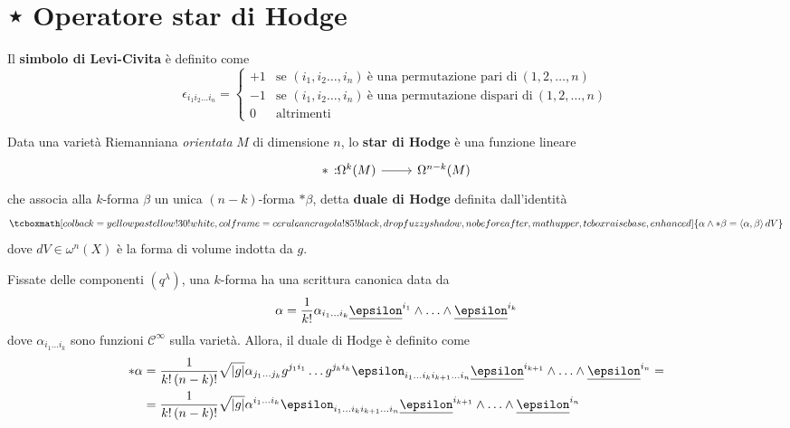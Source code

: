 \section{⋆ Operatore star di Hodge}
\begin{define}
	Il \textbf{simbolo di Levi-Civita} è definito come
	\begin{equation}
		\epsilon_{i_1i_2\ldots i_n}=\begin{cases}
			+1&\text{se }\left(i_1,i_2\ldots,i_n\right)\ \text{è una permutazione pari di}\ (1,2,\ldots, n)\\
			-1&\text{se }\left(i_1,i_2\ldots,i_n\right)\ \text{è una permutazione dispari di}\ (1,2,\ldots, n)\\
			0&\text{altrimenti}
		\end{cases}
	\end{equation}
\end{define}
\begin{define}%
	Data una varietà Riemanniana \textit{orientata} $M$ di dimensione $n$, lo \textbf{star di Hodge} è una funzione lineare
	\begin{equation*}
		\funz[\ast]{\Omega^k(M)}{\Omega^{n-k}(M)}
	\end{equation*}
	che associa alla $k$-forma $\beta$ un unica $(n-k)$-forma $\ast\beta$, detta \textbf{duale di Hodge} definita dall'identità
	\begin{equation}%
		\tcboxmath[colback=yellowpastellow!30!white,colframe=ceruleancrayola!85!black,drop fuzzy shadow, nobeforeafter, math upper, tcbox raise base, enhanced]{\alpha\wedge\ast\beta=\left<\alpha,\beta\right>dV}
	\end{equation}
	dove $dV\in\omega^n(X)$ è la forma di volume indotta da $g$.
\end{define}
Fissate delle componenti $\left(q^\lambda\right)$, una $k$-forma ha una scrittura canonica data da
\begin{equation}
	\alpha=\frac{1}{k!}\alpha_{i_1\ldots i_k}\fb{\epsilon}^{i_1}\wedge\ldots\wedge\fb{\epsilon}^{i_k}
\end{equation}
dove $\alpha_{i_1\ldots i_k}$ sono funzioni $\mathcal{C}^{\infty}$ sulla varietà. Allora, il duale di Hodge è definito come
\begin{align*}
\ast\alpha&=\frac{1}{k!\left(n-k\right)!}\sqrt{\abs{g}}\alpha_{j_1\ldots j_k}g^{j_1i_1}\ldots g^{j_ki_k}\epsilon_{i_1\ldots i_ki_{k+1}\ldots i_n}\fb{\epsilon}^{i_{k+1}}\wedge\ldots\wedge\fb{\epsilon}^{i_n}=\\
&=\frac{1}{k!\left(n-k\right)!}\sqrt{\abs{g}}\alpha^{i_1\ldots i_k}\epsilon_{i_1\ldots i_ki_{k+1}\ldots i_n}\fb{\epsilon}^{i_{k+1}}\wedge\ldots\wedge\fb{\epsilon}^{i_n}
\end{align*}
